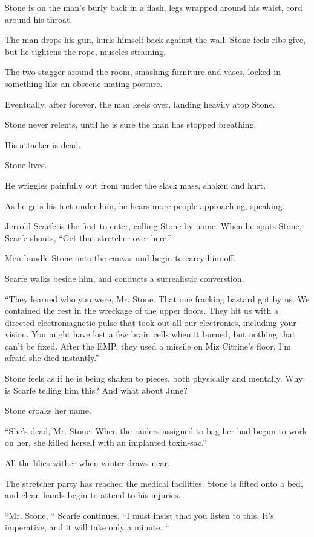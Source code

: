 Stone is on the man's burly back in a flash, legs wrapped around his waist, cord around his throat.

The man drops his gun, hurls himself back against the wall. Stone feels ribs give, but he tightens the rope, muscles straining.

The two stagger around the room, smashing furniture and vases, locked in something like an obscene mating posture.

Eventually, after forever, the man keels over, landing heavily atop Stone.

Stone never relents, until he is sure the man has stopped breathing.

His attacker is dead.

Stone lives.

He wriggles painfully out from under the slack mass, shaken and hurt.

As he gets his feet under him, he hears more people approaching, speaking.

Jerrold Scarfe is the first to enter, calling Stone by name. When he spots Stone, Scarfe shouts, ``Get that stretcher over here.''

Men bundle Stone onto the canvas and begin to carry him off.

Scarfe walks beside him, and conducts a surrealistic converstion.

``They learned who you were, Mr. Stone. That one fracking bastard got by us. We contained the rest in the wreckage of the upper floors. They hit us with a directed electromagnetic pulse that took out all our electronics, including your vision. You might have lost a few brain cells when it burned, but nothing that can't be fixed. After the EMP, they used a missile on Miz Citrine's floor. I'm afraid she died instantly.''

Stone feels as if he is being shaken to pieces, both physically and mentally. Why is Scarfe telling him this? And what about June?

Stone croaks her name.

``She's dead, Mr. Stone. When the raiders assigned to bag her had begun to work on her, she killed herself with an implanted toxin-sac.''

All the lilies wither when winter draws near.

The stretcher party has reached the medical facilities. Stone is lifted onto a bed, and clean hands begin to attend to his injuries.

``Mr. Stone, `` Scarfe continues, ``I must insist that you listen to this. It's imperative, and it will take only a minute. ``

